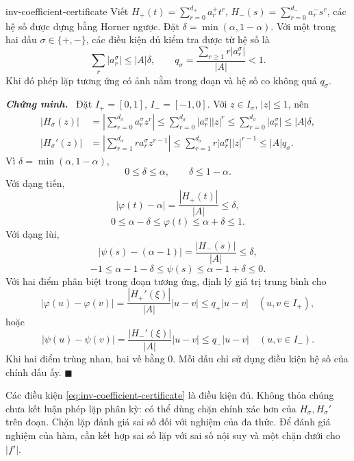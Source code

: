 \documentclass[12pt,a4paper,oneside]{book}
\numberwithin{algorithm}{chapter}
\theoremstyle{definition}
\newenvironment{chungminh}{\par\medskip\noindent\textbf{\textit{\color{mainblue}Chứng minh.}}\ }{\hfill$\blacksquare$\par\medskip}
\begin{document}
\begin{menhde}{}{inv-coefficient-certificate}
Viết $H_+(t)=\sum_{r=0}^{d_+}a_r^+t^r$, $H_-(s)=\sum_{r=0}^{d_-}a_r^-s^r$, các hệ số được dựng bằng Horner ngược. Đặt $\delta=\min(\alpha,1-\alpha)$. Với một trong hai dấu $\sigma\in\{+,-\}$, các điều kiện đủ kiểm tra được từ hệ số là
\begin{equation}\label{eq:inv-coefficient-certificate}
 \sum_r|a_r^\sigma|\leq|A|\delta,
 \qquad q_\sigma=\frac{\sum_{r\geq1}r|a_r^\sigma|}{|A|}<1.
\end{equation}
Khi đó phép lặp tương ứng có ảnh nằm trong đoạn và hệ số co không quá $q_\sigma$.
\end{menhde}
\begin{chungminh}
Đặt $I_+=[0,1]$, $I_-=[-1,0]$. Với $z\in I_\sigma$, $|z|\leq1$, nên
\begin{align*}
 |H_\sigma(z)|
 &=\left|\sum_{r=0}^{d_\sigma}a_r^\sigma z^r\right|
 \leq\sum_{r=0}^{d_\sigma}|a_r^\sigma||z|^r
 \leq\sum_{r=0}^{d_\sigma}|a_r^\sigma|
 \leq|A|\delta,\\
 |H_\sigma'(z)|
 &=\left|\sum_{r=1}^{d_\sigma}r a_r^\sigma z^{r-1}\right|
 \leq\sum_{r=1}^{d_\sigma}r|a_r^\sigma||z|^{r-1}
 \leq|A|q_\sigma.
\end{align*}
Vì $\delta=\min(\alpha,1-\alpha)$,
\[
 0\leq\delta\leq\alpha,\qquad\delta\leq1-\alpha.
\]
Với dạng tiến,
\[
 |\varphi(t)-\alpha|=\frac{|H_+(t)|}{|A|}\leq\delta,
\]
\[
 0\leq\alpha-\delta\leq\varphi(t)
 \leq\alpha+\delta\leq1.
\]
Với dạng lùi,
\[
 |\psi(s)-(\alpha-1)|=\frac{|H_-(s)|}{|A|}\leq\delta,
\]
\[
 -1\leq\alpha-1-\delta\leq\psi(s)
 \leq\alpha-1+\delta\leq0.
\]
Với hai điểm phân biệt trong đoạn tương ứng, định lý giá trị trung bình cho
\[
 |\varphi(u)-\varphi(v)|
 =\frac{|H_+'(\xi)|}{|A|}|u-v|\leq q_+|u-v|
 \quad(u,v\in I_+),
\]
hoặc
\[
 |\psi(u)-\psi(v)|
 =\frac{|H_-'(\xi)|}{|A|}|u-v|\leq q_-|u-v|
 \quad(u,v\in I_-).
\]
Khi hai điểm trùng nhau, hai vế bằng $0$. Mỗi dấu chỉ sử dụng điều kiện hệ số của chính dấu ấy.
\end{chungminh}
Các điều kiện \eqref{eq:inv-coefficient-certificate} là điều kiện đủ. Không thỏa chúng chưa kết luận phép lặp phân kỳ: có thể dùng chặn chính xác hơn của $H_\sigma,H_\sigma'$ trên đoạn. Chặn lặp đánh giá sai số đối với nghiệm của đa thức. Để đánh giá nghiệm của hàm, cần kết hợp sai số lặp với sai số nội suy và một chặn dưới cho $|f'|$.
\end{document}
